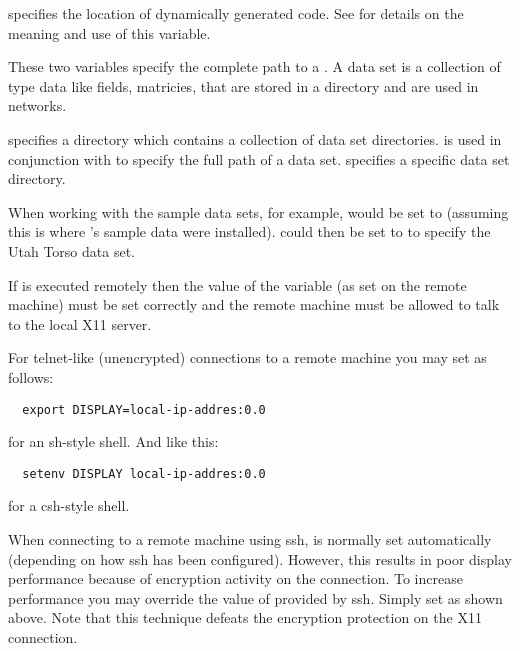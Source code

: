 \begin{description}
   specifies the location of
  dynamically generated code.  See  for details on the meaning and use of
  this variable.
  
    These
  two variables specify the complete path to a \sr{} .
  A data set is a collection of \sr{} type data like fields,
  matricies, \etc{} that are stored in a directory and are used in
  \sr{} networks.

   specifies a directory which contains a
  collection of data set directories.   is used in
  conjunction with  to specify the full path of
  a data set.   specifies a specific data set
  directory. 

  When working with the sample \sr{} data sets, for example,
   would be set to
   (assuming this is where \sr{}'s
  sample data were installed).   could then be
  set to  to specify the Utah Torso data set.
  
   If \sr{} is executed remotely then the value of
  the  variable (as set on the remote machine) must be
  set correctly and the remote machine must be allowed to talk to the
  local X11 server.
  
  For telnet-like (unencrypted) connections to a remote machine
  you may set  as follows:

\begin{verbatim}
  export DISPLAY=local-ip-addres:0.0
\end{verbatim}
  
  for an sh-style shell. And like this:

\begin{verbatim}
  setenv DISPLAY local-ip-addres:0.0
\end{verbatim}

  for a csh-style shell.

  When connecting to a remote machine using ssh,  is
  normally set automatically (depending on how ssh has been
  configured).  However, this results in poor display performance
  because of encryption activity on the connection.  To increase
  performance you may override the value of  provided
  by ssh.  Simply set  as
  shown above.  Note that this technique defeats the encryption
  protection on the X11 connection.


\end{description}
